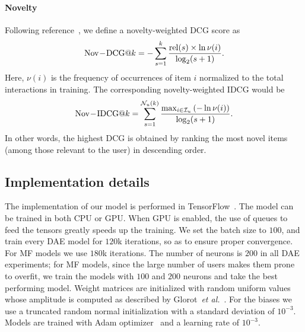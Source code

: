 \paragraph{Novelty} Following reference~\cite{Vargas:2011:Novelty_diversity}, we define a novelty-weighted DCG score as
\begin{equation}\label{eq:nov-ndcg}
{\rm Nov\!-\!DCG}@k = 
-\sum_{s=1}^k \frac{{\rm rel}(s)\times \ln{\nu(i)}}
{\log_2(s+1)}.
\end{equation}
Here, $\nu(i)$ is the frequency of occurrences of item $i$  normalized to the total interactions in training. The corresponding novelty-weighted IDCG would be
\begin{equation}
{\rm Nov\!-\!IDCG}@k = 
\sum_{s=1}^{\mathcal{N}_u(k)} 
\frac{\max_{i\in\mathcal{I}_u}\left(-\ln \nu(i)\right)}
{\log_2(s+1)}.
\end{equation}
In other words, the highest DCG is obtained by ranking the most novel items (among those relevant to the user) in descending order. 
\subsection{Implementation details}\label{subsec:implementation}
The implementation of our model is performed in TensorFlow~\cite{tensorflow2015-whitepaper}.
The model can be trained in both CPU or GPU. 
When GPU is enabled, the use of queues to feed the tensors greatly speeds up the training.
We set the batch size to $100$, and train every DAE model for $120$k iterations, so as to ensure proper convergence. For MF models we use $180$k iterations.
The number of neurons is $200$ in all DAE experiments; for MF models, since the large number of users makes them prone to overfit, we train the models with $100$ and $200$ neurons and take the best performing model.
Weight matrices are initialized with random uniform values whose amplitude is computed as described by Glorot~\emph{et al.}~\cite{Xavier_initialization}. 
For the biases we use a truncated random normal initialization with a standard deviation of $10^{-3}$. 
Models are trained with Adam optimizer~\cite{Kingma2014AdamAM} and a learning rate of $10^{-3}$.

